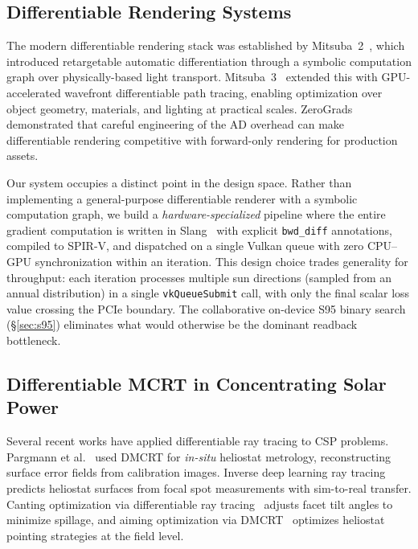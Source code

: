 \documentclass{CVM}
\begin{document}
\subsection{Differentiable Rendering Systems}

The modern differentiable rendering stack was established by Mitsuba~2~\cite{mitsuba2},
which introduced retargetable automatic differentiation through a symbolic
computation graph over physically-based light transport. Mitsuba~3~\cite{mitsuba3}
extended this with GPU-accelerated wavefront differentiable path tracing,
enabling optimization over object geometry, materials, and lighting at
practical scales. ZeroGrads~\cite{zerograds} demonstrated that careful
engineering of the AD overhead can make differentiable rendering competitive
with forward-only rendering for production assets.

Our system occupies a distinct point in the design space. Rather than
implementing a general-purpose differentiable renderer with a symbolic
computation graph, we build a \emph{hardware-specialized} pipeline where the
entire gradient computation is written in Slang~\cite{slang} with explicit
\verb|bwd_diff| annotations, compiled to SPIR-V, and dispatched on a single
Vulkan queue with zero CPU--GPU synchronization within an iteration. This
design choice trades generality for throughput: each iteration processes
multiple sun directions (sampled from an annual distribution) in a single
\verb|vkQueueSubmit| call, with only the final scalar loss value crossing the
PCIe boundary. The collaborative on-device S95 binary search
(\S\ref{sec:s95}) eliminates what would otherwise be the dominant readback
bottleneck.

\subsection{Differentiable MCRT in Concentrating Solar Power}

Several recent works have applied differentiable ray tracing to CSP problems.
Pargmann et al.~\cite{pargmann2024} used DMCRT for \emph{in-situ} heliostat
metrology, reconstructing surface error fields from calibration images.
Inverse deep learning ray tracing~\cite{inverse2025a,inverse2025b} predicts
heliostat surfaces from focal spot measurements with sim-to-real transfer.
Canting optimization via differentiable ray tracing~\cite{canting2025}
adjusts facet tilt angles to minimize spillage, and aiming optimization via
DMCRT~\cite{aiming2025} optimizes heliostat pointing strategies at the field
level.
\end{document}
